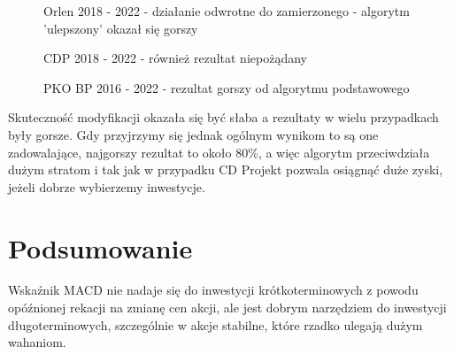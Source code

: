 \documentclass{article}
\begin{document}
    \begin{figure}[H]
        \noindent{}
        \caption{Orlen 2018 - 2022 - działanie odwrotne do zamierzonego - algorytm 'ulepszony' okazał się gorszy}
    \end{figure}
    \begin{figure}[H]
        \noindent{}
        \caption{CDP 2018 - 2022 - również rezultat niepożądany}
    \end{figure}
    \begin{figure}[H]
        \noindent{}
        \caption{PKO BP 2016 - 2022 - rezultat gorszy od algorytmu podstawowego}
    \end{figure}

    Skuteczność modyfikacji okazała się być słaba a rezultaty w wielu przypadkach były gorsze.
    Gdy przyjrzymy się jednak ogólnym wynikom to są one zadowalające, najgorszy rezultat to około 80\%,
    a więc algorytm przeciwdziała dużym stratom i tak jak w przypadku CD Projekt pozwala osiągnąć duże zyski, 
    jeżeli dobrze wybierzemy inwestycje.

\section{Podsumowanie}
    Wskaźnik MACD nie nadaje się do inwestycji krótkoterminowych z powodu opóźnionej rekacji na
    zmianę cen akcji, ale jest dobrym narzędziem do inwestycji długoterminowych, szczególnie w akcje stabilne,
    które rzadko ulegają dużym wahaniom. 
\end{document}
